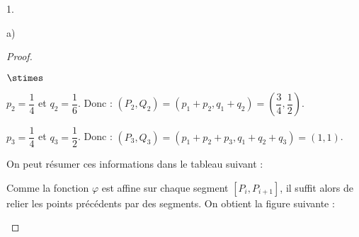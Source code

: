 \documentclass[11pt]{article}%
\begin{document}
\begin{noliste}{1.}
\begin{noliste}{a)}
\begin{proof}
\begin{noliste}{$\stimes$}
    \item $p_2=\dfrac{1}{4}$ et $q_2=\dfrac{1}{6}$. Donc : $(P_2,Q_2)
    =(p_1+p_2,q_1+q_2) = \left(\dfrac{3}{4}, \dfrac{1}{2}\right)$.
    
    \item $p_3=\dfrac{1}{4}$ et $q_3 = \dfrac{1}{2}$. Donc : 
    $(P_3, Q_3) = (p_1+p_2+p_3, q_1+q_2+q_3) = (1,1)$.
  \end{noliste}
  On peut résumer ces informations dans le tableau suivant : %
  
  \begin{center}
  \end{center}
  Comme la fonction $\varphi$ est affine sur chaque segment $[P_i, 
  P_{i+1}]$, il suffit alors de relier les points précédents par des 
  segments. On obtient la figure suivante :~\\[-.6cm]
    \begin{center}
%               
% 
%       
%       
%       

\end{center}
\end{proof}
\end{noliste}
\end{noliste}
\end{document}
